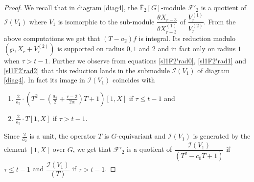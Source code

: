 \documentclass[10pt,a4paper]{amsart}
\newcommand{\F}{\mathbb{F}}
\newcommand\sF{{\mathcal{F}}}
\begin{document}
\begin{proof}
 We recall that in diagram \eqref{diag4}, the $\bar{\F}_{2}[G]$-module $\sF'_{2}$ is a quotient of $\mathcal{I}(V_{1})$ where $V_{1}$ is isomorphic to the sub-module $\dfrac{\theta X_{r-3}}{\theta X_{r-3}^{(1)}}$ of $\dfrac{V_{r}^{(1)}}{V_{r}^{(2)}}$. From the above computations we get that $(T-a_{2})f$ is integral. Its reduction modulo $(\wp, X_{r}+V_{r}^{(2)})$ is supported on radius $0,1$ and $2$ and in fact only on radius $1$ when $\tau>t-1$. Further we observe from equations    \eqref{sl1F2'rad0}, \eqref{sl1F2'rad1} and \eqref{sl1F2'rad2} that this reduction lands in the submodule $\mathcal{I}(V_{1})$ of diagram \eqref{diag4}. In fact its image in $\mathcal{I}(V_{1})$ coincides with 
 \begin{enumerate}
\item $\frac{2}{a_{2}}\cdot \left(T^2- \overline{\left(\frac{a_{2}}{2}+ \frac{r-2}{2\alpha}\right)}T + 1\right)\left[1, X\right]$ \enspace   if   $\tau\leq t-1$ and
\item $\frac{2}{a_{2}} \cdot T\left[1,X\right]$ \enspace  if  $\tau>t-1.$
\end{enumerate}
 Since $\frac{2}{a_{2}}$ is a unit, the operator $T$ is $G$-equivariant and $\mathcal{I}(V_{1})$ is generated by the element $[1,X]$ over $G$, we get that $\sF'_{2}$ is a quotient of $\dfrac{\mathcal{I}(V_{1})}{(T^2-c_{0}T+1)}$ if $\tau \leq t-1$ and $\dfrac{\mathcal{I}(V_{1})}{(T)}$ if $\tau>t-1$.
\end{proof}
\end{document}

